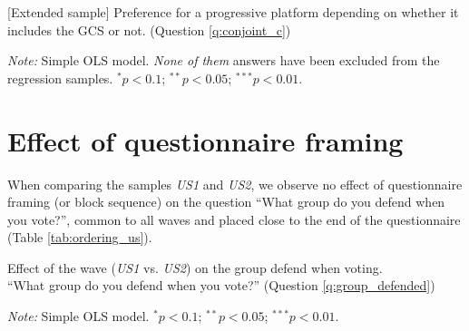 \begin{table}[h]
    \cprotect\caption[(Extended sample) Influence of the GCS on electoral prospects]{[Extended sample] Preference for a progressive platform depending on whether it includes the GCS or not. (Question \ref{q:conjoint_c}) 
  } 
    \makebox[\textwidth][c]{}\label{tab:_alla}
    {\footnotesize \textit{Note:} Simple OLS model. \textit{None of them} answers have been excluded from the regression samples. $^{*}p<0.1$; $^{**} p<0.05$; $^{***} p<0.01$. 
    }
\end{table}

\clearpage
\section{Effect of questionnaire framing}\label{app:ordering_us}

When comparing the samples \textit{US1} and \textit{US2}, we observe no effect of questionnaire framing (or block sequence) on the question ``What group do you defend when you vote?'', common to all waves and placed close to the end of the questionnaire (Table \ref{tab:ordering_us}).

\begin{table}[h]
    \cprotect\caption[Effect of the wave on group defend when voting]{Effect of the wave (\textit{US1} vs. \textit{US2}) on the group defend when voting. \\ ``What group do you defend when you vote?'' (Question \ref{q:group_defended}) 
  } 
    \makebox[\textwidth][c]{}\label{tab:ordering_us}
    {\footnotesize \textit{Note:} Simple OLS model. $^{*}p<0.1$; $^{**} p<0.05$; $^{***} p<0.01$. 
    }
\end{table}